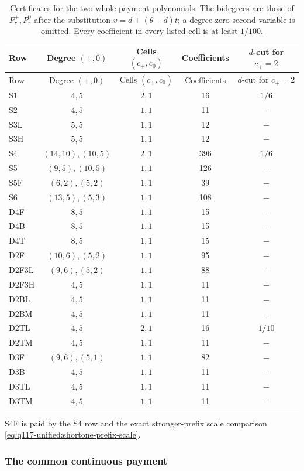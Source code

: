 \begin{longtable}{@{}lcccc@{}}
\caption{Certificates for the two whole payment polynomials.
The bidegrees are those of \(P_r^+,P_r^0\) after the substitution
\(v=d+(\theta-d)t\); a degree-zero second variable is omitted.
Every coefficient in every listed cell is at least \(1/100\).}
\label{tab:q117-unified:scalar-certificates}\\
\toprule
Row&Degree \((+,0)\)&Cells \((c_+,c_0)\)&Coefficients&\(d\)-cut for \(c_+=2\)\\
\midrule\endfirsthead
\toprule
Row&Degree \((+,0)\)&Cells \((c_+,c_0)\)&Coefficients&\(d\)-cut for \(c_+=2\)\\
\midrule\endhead
S1&\(4,5\)&\(2,1\)&16&\(1/6\)\\
S2&\(4,5\)&\(1,1\)&11&\(-\)\\
S3L&\(5,5\)&\(1,1\)&12&\(-\)\\
S3H&\(5,5\)&\(1,1\)&12&\(-\)\\
S4&\((14,10),(10,5)\)&\(2,1\)&396&\(1/6\)\\
S5&\((9,5),(10,5)\)&\(1,1\)&126&\(-\)\\
S5F&\((6,2),(5,2)\)&\(1,1\)&39&\(-\)\\
S6&\((13,5),(5,3)\)&\(1,1\)&108&\(-\)\\
D4F&\(8,5\)&\(1,1\)&15&\(-\)\\
D4B&\(8,5\)&\(1,1\)&15&\(-\)\\
D4T&\(8,5\)&\(1,1\)&15&\(-\)\\
D2F&\((10,6),(5,2)\)&\(1,1\)&95&\(-\)\\
D2F3L&\((9,6),(5,2)\)&\(1,1\)&88&\(-\)\\
D2F3H&\(4,5\)&\(1,1\)&11&\(-\)\\
D2BL&\(4,5\)&\(1,1\)&11&\(-\)\\
D2BM&\(4,5\)&\(1,1\)&11&\(-\)\\
D2TL&\(4,5\)&\(2,1\)&16&\(1/10\)\\
D2TM&\(4,5\)&\(1,1\)&11&\(-\)\\
D3F&\((9,6),(5,1)\)&\(1,1\)&82&\(-\)\\
D3B&\(4,5\)&\(1,1\)&11&\(-\)\\
D3TL&\(4,5\)&\(1,1\)&11&\(-\)\\
D3TM&\(4,5\)&\(1,1\)&11&\(-\)\\
\bottomrule
\end{longtable}
S4F is paid by the S4 row and the exact stronger-prefix scale
comparison \eqref{eq:q117-unified:shortone-prefix-scale}.

\subsubsection{The common continuous payment}
\label{sec:q117-unified:payments}

